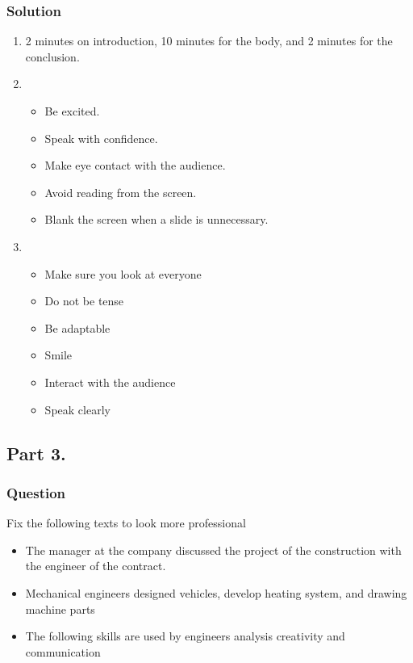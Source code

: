 \documentclass[a4paper, 10pt]{article}
\begin{document}
			\subsubsection{Solution}
				\begin{enumerate}
					\item 2 minutes on introduction, 10 minutes for the body, and 2 minutes for the conclusion.
					\item 
						\begin{itemize}
							\item Be excited.
							\item Speak with confidence.
							\item Make eye contact with the audience.
							\item Avoid reading from the screen.
							\item Blank the screen when a slide is unnecessary.
						\end{itemize}
					\item 
						\begin{itemize}
							\item Make sure you look at everyone
							\item Do not be tense
							\item Be adaptable
							\item Smile
							\item Interact with the audience
							\item Speak clearly
						\end{itemize}
				\end{enumerate}
	
	\subsection{Part 3.}
			\subsubsection{Question}
				\noindent Fix the following texts to look more professional
				\begin{itemize}
					\item The manager at the company discussed the project of the construction with the engineer of the contract.
					\item Mechanical engineers designed vehicles, develop heating system, and drawing machine parts
					\item The following skills are used by engineers analysis creativity and communication
				\end{itemize}
\end{document}
